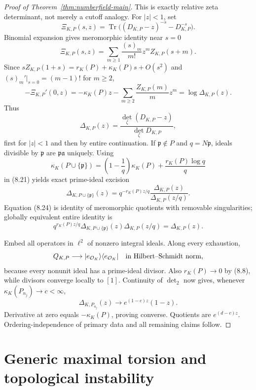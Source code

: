 \documentclass[11pt]{article}
\theoremstyle{definition}
\theoremstyle{remark}
\newcommand{\Tr}{\operatorname{Tr}}
\begin{document}
\begin{proof}[Proof of Theorem~\ref{thm:numberfield-main}]
This is exactly relative zeta determinant, not merely a cutoff analogy.  For $|z|<1$, set
\[
 \Xi_{K,P}(s,z)=\Tr\bigl((D_{K,P}-z)^{-s}-D_{K,P}^{-s}\bigr).
\]
Binomial expansion gives meromorphic identity near $s=0$
\begin{equation}
 \Xi_{K,P}(s,z)=\sum_{m\geq1}\frac{(s)_m}{m!}z^mZ_{K,P}(s+m).
                                                                    \tag{8.22}
\end{equation}
Since $sZ_{K,P}(1+s)=r_K(P)+\kappa_K(P)s+O(s^2)$ and
$(s)_m'|_{s=0}=(m-1)!$ for $m\geq2$,
\[
 -\Xi_{K,P}'(0,z)=-\kappa_K(P)z-
     \sum_{m\geq2}\frac{Z_{K,P}(m)}m z^m=\log\Delta_{K,P}(z).
\]
Thus
\begin{equation}
 \Delta_{K,P}(z)=\frac{\det_\zeta(D_{K,P}-z)}{\det_\zeta D_{K,P}},
                                                                    \tag{8.23}
\end{equation}
first for $|z|<1$ and then by entire continuation.  If $\mathfrak p\notin P$ and
$q=N\mathfrak p$, ideals divisible by $\mathfrak p$ are $\mathfrak p\mathfrak a$ uniquely.
Using
\[
 \kappa_K(P\cup\{\mathfrak p\})=\left(1-\frac1q\right)\kappa_K(P)
 +\frac{r_K(P)\log q}{q}
\]
in (8.21) yields exact prime-ideal excision
\begin{equation}
 \boxed{\displaystyle
 \Delta_{K,P\cup\{\mathfrak p\}}(z)
 =q^{-r_K(P)z/q}\frac{\Delta_{K,P}(z)}{\Delta_{K,P}(z/q)}.}       \tag{8.24}
\end{equation}
Equation (8.24) is identity of meromorphic quotients with removable singularities; globally
equivalent entire identity is
\[
 q^{r_K(P)z/q}\Delta_{K,P\cup\{\mathfrak p\}}(z)
 \Delta_{K,P}(z/q)=\Delta_{K,P}(z).
\]

Embed all operators in $\ell^2$ of nonzero integral ideals.  Along every exhaustion,
\[
 Q_{K,P}\longrightarrow|e_{\mathcal O_K}\rangle\langle e_{\mathcal O_K}|
 \quad\hbox{in Hilbert--Schmidt norm},
\]
because every nonunit ideal has a prime-ideal divisor.  Also $r_K(P)\to0$ by (8.8), while
divisors converge locally to $[1]$.  Continuity of $\det_2$ now gives, whenever
$\kappa_K(P_{n_j})\to c<\infty$,
\[
 \Delta_{K,P_{n_j}}(z)\longrightarrow e^{(1-c)z}(1-z).
\]
Derivative at zero equals $-\kappa_K(P)$, proving converse.  Quotients are $e^{(d-c)z}$.
Ordering-independence of primary data and all remaining claims follow.
\end{proof}

\section{Generic maximal torsion and topological instability}
\label{sec:generic}
\end{document}
